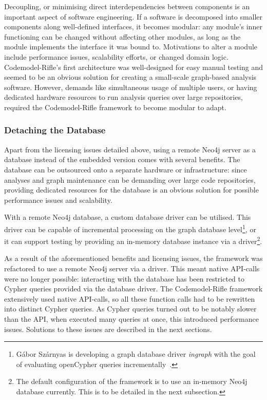 Decoupling, or minimising direct interdependencies between components is an important aspect of software engineering. If a software is decomposed into smaller components along well-defined interfaces, it becomes modular: any module's inner functioning can be changed without affecting other modules, as long as the module implements the interface it was bound to. Motivations to alter a module include performance issues, scalability efforts, or changed domain logic. Codemodel-Rifle's first architecture was well-designed for easy manual testing and seemed to be an obvious solution for creating a small-scale graph-based analysis software. However, demands like simultaneous usage of multiple users, or having dedicated hardware resources to run analysis queries over large repositories, required the Codemodel-Rifle framework to become modular to adapt.


\subsubsection{Detaching the Database}

Apart from the licensing issues detailed above, using a remote Neo4j server as a database instead of the embedded version comes with several benefits. The database can be outsourced onto a separate hardware or infrastructure: since analyses and graph maintenance can be demanding over large code repositories, providing dedicated resources for the database is an obvious solution for possible performance issues and scalability.

With a remote Neo4j database, a custom database driver can be utilised. This driver can be capable of incremental processing on the graph database level\footnote{Gábor Szárnyas is developing a graph database driver \emph{ingraph} with the goal of evaluating openCypher queries incrementally~\cite{ingraph-github}.}, or it can support testing by providing an in-memory database instance via a driver\footnote{The default configuration of the framework is to use an in-memory Neo4j database currently. This is to be detailed in the next subsection.}.

As a result of the aforementioned benefits and licensing issues, the framework was refactored to use a remote Neo4j server via a driver. This meant native API-calls were no longer possible: interacting with the database has been restricted to Cypher queries provided via the database driver. The Codemodel-Rifle framework extensively used native API-calls, so all these function calls had to be rewritten into distinct Cypher queries. As Cypher queries turned out to be notably slower than the API, when executed many queries at once, this introduced performance issues. Solutions to these issues are described in the next sections.


